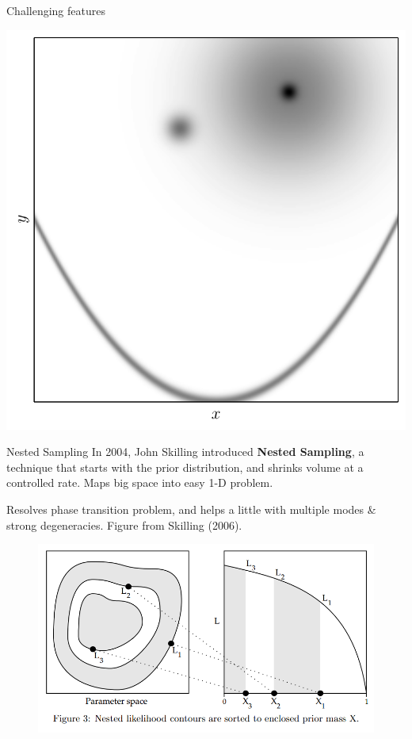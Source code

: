 \begin{frame}[t]{Challenging features}
\begin{center}
\includegraphics[scale=0.4]{challenges.pdf}
\end{center}
\end{frame}

\begin{frame}[t]{Nested Sampling}
In 2004, John Skilling introduced {\bf Nested Sampling}, a technique
that starts with the prior distribution, and shrinks volume at a controlled
rate. Maps big space into easy 1-D problem.

Resolves phase transition problem, and helps a little with multiple modes \&
strong degeneracies. Figure from Skilling (2006).

\begin{figure}
\begin{center}
\includegraphics[scale=0.2]{ns.png}
\end{center}
\end{figure}

\end{frame}

